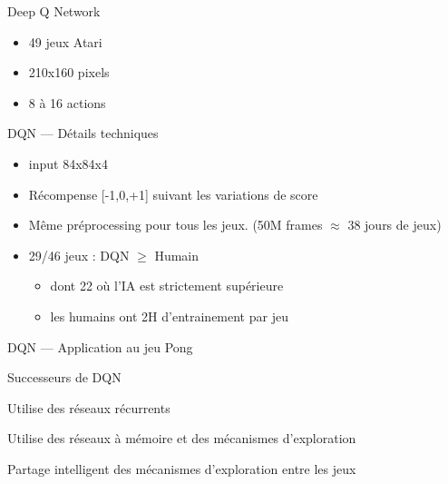 \begin{frame}{Deep Q Network}
  \begin{itemize}
  \item 49 jeux Atari
  \item 210x160 pixels
  \item 8 à 16 actions
  \end{itemize}
\end{frame}

\begin{frame}{DQN --- Détails techniques}
  \begin{itemize}
  \item input 84x84x4
  \item Récompense [-1,0,+1] suivant les variations de score
  \item Même préprocessing pour tous les jeux. (50M frames $\approx$ 38 jours de jeux)
  \item 29/46 jeux : DQN $\geq$ Humain
    \begin{itemize}
    \item dont 22 où l'IA est strictement supérieure
    \item les humains ont 2H d'entrainement par jeu
    \end{itemize}
  \end{itemize}
\end{frame}

\begin{frame}{DQN --- Application au jeu Pong}
\end{frame}

\begin{frame}{Successeurs de DQN}
  \begin{description}[<+->]
    \item[R2D2] Utilise des réseaux récurrents
    \item[Never Give Up] Utilise des réseaux à mémoire et des mécanismes d'exploration
    \item[Agent57] Partage intelligent des mécanismes d'exploration entre les jeux
  \end{description}

\end{frame}
